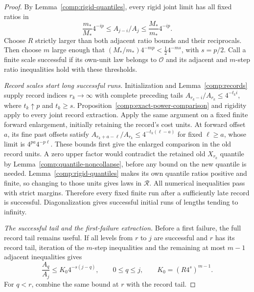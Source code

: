 \begin{proof}
By Lemma~\ref{comp:rigid-quantiles}, every rigid joint limit has all
fixed ratios in
\[
 \frac{m_*}{M_*}4^{-ip}
 \le A_{j-i}/A_j\le
 \frac{M_*}{m_*}4^{-ip}.
\]
Choose $R$ strictly larger than both adjacent ratio bounds and their
reciprocals.  Then choose $m$ large enough that
$(M_*/m_*)4^{-mp}<\tfrac12 4^{-ms}$, with $s=p/2$.
Call a finite scale successful if its own-unit law belongs to
$\mathcal O$ and its adjacent and $m$-step ratio inequalities hold
with these thresholds.

\smallskip\noindent\emph{Record scales start long successful runs.}
Initialization and Lemma~\ref{comp:records} supply record indices
$r_k\to\infty$ with complete preceding tails
$A_{r_k-i}/A_{r_k}\le4^{-t_ki}$, where $t_k\uparrow p$ and
$t_k\ge s$.  Proposition~\ref{comp:exact-power-comparison} and
rigidity apply to every joint record extraction.  Apply the same
argument on a fixed finite forward enlargement, initially retaining
the record's cost units.  At forward offset $a$, its fine past
offsets satisfy
$A_{r_k+a-\ell}/A_{r_k}\le4^{-t_k(\ell-a)}$ for fixed
$\ell\ge a$, whose limit is $4^{pa}4^{-p\ell}$.
These bounds first give the enlarged comparison in the old record
units.  A zero upper factor would contradict the retained old
$X_{r_k}$ quantile by Lemma~\ref{comp:quantile-noncollapse}, before
any bound on the new quantile is needed.
Lemma~\ref{comp:rigid-quantiles} makes its
own quantile ratios positive and finite, so changing to those units
gives laws in $\mathcal R$.  All numerical inequalities pass with
strict margins.  Therefore every fixed finite run after a sufficiently
late record is successful.  Diagonalization gives successful initial
runs of lengths tending to infinity.

\smallskip\noindent\emph{The successful tail and the first-failure extraction.}
Before a first failure, the full record tail remains useful.  If all
levels from $r$ to $j$ are successful and $r$ has its record tail,
iteration of the $m$-step inequalities and the remaining at most
$m-1$ adjacent inequalities gives
\[
 \frac{A_q}{A_j}\le K_0 4^{-s(j-q)},\qquad 0\le q\le j,
 \qquad K_0=(R4^s)^{m-1}.
\]
For $q<r$, combine the same bound at $r$ with the record tail.


\end{proof}
